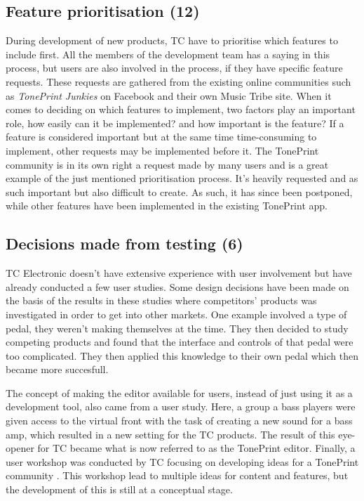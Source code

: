 \subsection*{Feature prioritisation (12)}
\label{ThemePrioritizingOfFeatures}
During development of new products, TC have to prioritise which features to include first. All the members of the development team has a saying in this process, but users are also involved in the process, if they have specific feature requests. These requests are gathered from the existing online communities such as \textit{TonePrint Junkies} on Facebook and their own Music Tribe site. When it comes to deciding on which features to implement, two factors play an important role, how easily can it be implemented? and how important is the feature? If a feature is considered important but at the same time time-consuming to implement, other requests may be implemented before it. The TonePrint community is in its own right a request made by many users and is a great example of the just mentioned prioritisation process. It's heavily requested and as such important but also difficult to create. As such, it has since been postponed, while other features have been implemented in the existing TonePrint app.

\subsection*{Decisions made from testing (6)}
\label{App:ThemeDecisionsBasedOnTest}
TC Electronic doesn't have extensive experience with user involvement but have already conducted a few user studies. Some design decisions have been made on the basis of the results in these studies where competitors' products was investigated in order to get into other markets. One example involved a type of pedal, they weren't making themselves at the time. They then decided to study competing products and found that the interface and controls of that pedal were too complicated. They then applied this knowledge to their own pedal which then became more succesfull.
 
 The concept of making the editor available for users, instead of just using it as a development tool, also came from a user study. Here, a group a bass players were given access to the virtual front with the task of creating a new sound for a bass amp, which resulted in a new setting for the TC products. The result of this eye-opener for TC became what is now referred to as the TonePrint editor. Finally, a user workshop was conducted by TC focusing on developing ideas for a TonePrint community \parencite{PDF:BrugerWorkshopUserTonePrints}. This workshop lead to multiple ideas for content and features, but the development of this is still at a conceptual stage.
 

